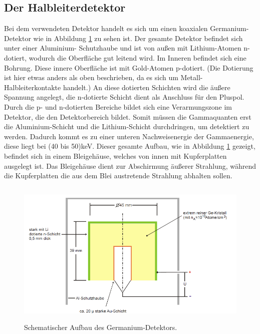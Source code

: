 \subsection{Der Halbleiterdetektor}
Bei dem verwendeten Detektor handelt es sich um einen koaxialen Germanium-Detektor wie in Abbildung
\ref{fig:Aufbau} zu sehen ist. Der gesamte Detektor befindet sich unter einer Aluminium-
Schutzhaube und ist von außen mit Lithium-Atomen n-dotiert, wodurch die Oberfläche
gut leitend wird. Im Inneren befindet sich eine Bohrung. Diese innere Oberfläche ist
mit Gold-Atomen p-dotiert. (Die Dotierung ist hier etwas anders als oben beschrieben, da es sich um
Metall-Halbleiterkontakte handelt.) An diese dotierten Schichten wird die
äußere Spannung angelegt, die n-dotierte Schicht dient als Anschluss für den Pluspol.
Durch die p- und n-dotierten Bereiche bildet sich eine
Verarmungszone im Detektor, die den Detektorbereich bildet. Somit müssen die Gammaquanten erst
die Aluminium-Schicht und die Lithium-Schicht durchdringen, um detektiert zu werden. Dadurch kommt es zu einer
unteren Nachweisenergie der Gammaenergie, diese liegt bei (40 bis 50)\;keV.
Dieser gesamte Aufbau, wie in Abbildung \ref{fig:Aufbau} gezeigt, befindet sich in einem
Bleigehäuse, welches von innen mit Kupferplatten ausgelegt ist. Das Bleigehäuse dient zur Abschirmung
äußerer Strahlung, während die Kupferplatten die aus dem Blei austretende Strahlung
abhalten sollen.

\begin{figure}
  \centering
  \includegraphics[height=7cm]{Aufbau.png}
  \caption{Schematischer Aufbau des Germanium-Detektors. \cite{skript}}
  \label{fig:Aufbau}
\end{figure}

